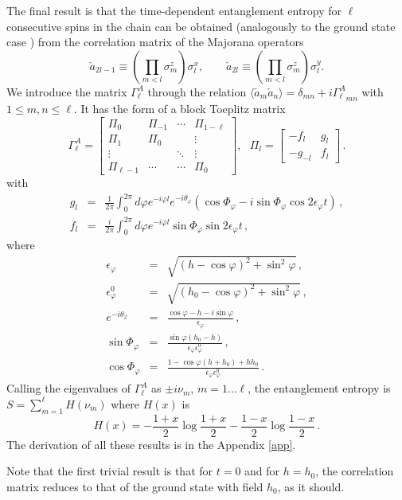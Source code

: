 \documentclass[12pt,preprint,tighten,eqsecnum,aps,floats,psfig,epsfig,amsmath,onecolumn]{revtex4-1}
\def\be{\begin{equation}}
\def\ee{\end{equation}}
\def\bea{\begin{eqnarray}}
\def\eea{\end{eqnarray}}
\def\e{\epsilon}
\def\p{\varphi}
\def\Ma{\check{a}}
\newcommand{\ev}[1]{\mbox{$\langle #1 \rangle$}}
\begin{document}
The final result is that the time-dependent entanglement entropy for 
$\ell$ 
consecutive spins in the chain can be obtained (analogously to the ground
state case \cite{Vidal}) from the correlation matrix of the Majorana 
operators
\be
\Ma_{2l-1} \equiv \left( \prod_{m<l} \sigma_m^z \right) \sigma_l^x, \qquad
\Ma_{2l} \equiv \left( \prod_{m<l} \sigma_m^z \right) \sigma_l^y.
\label{eq:aa}
\ee
We introduce the matrix $\Gamma^A_\ell$ through the relation
 $\ev{\Ma_m\Ma_n} = \delta_{mn} + i {\Gamma^A_\ell}_{mn}$ with $1\leq m,n\leq \ell$.
It has the form of a block Toeplitz matrix
\be
\Gamma^A_\ell = \left[
 \begin{array}{ccccc}
\Pi_0  & \Pi_{-1}   &   \cdots & \Pi_{1-\ell}  \\
\Pi_1 & \Pi_0   & &\vdots\\

\vdots&  & \ddots&\vdots  \\
\Pi_{\ell-1}& \cdots  & \cdots  & \Pi_0 
\end{array}
\right], ~~~ \Pi_l = \left[\begin{array}{cc}
-f_l    & g_l \\
-g_{-l} & f_l
\end{array}
\right]\,.
\label{eq:GammaAL}
\ee
with
\bea
g_l &=&  \frac{1}{2\pi} \int_0^{2\pi} d\p e^{-i\p l} e^{-i\theta_\p}
(\cos \Phi_\p-i\sin \Phi_\p \cos 2\e_\p t)
\,,\nonumber\\
f_l&=& \frac{i}{2\pi} \int_0^{2\pi} d\p e^{-i\p l} \sin \Phi_\p \sin 2 \e_\p t
\,,
\label{eq:g2}
\eea
where
\bea
\e_\p &=& \sqrt{(h-\cos{\p})^2 +  \sin^2{\p}}\,,\nonumber\\
\e_\p^0 &=& \sqrt{(h_0-\cos{\p})^2 +  \sin^2{\p}}\,,\nonumber\\
e^{-i\theta_\p}&=& \frac{\cos\p-h-i\sin\p}{\e_\p}\,,\nonumber\\
\sin \Phi_\p&=&\frac{\sin\p(h_0-h)}{\e_\p \e_\p^0}\,, \nonumber\\
\cos \Phi_\p&=&\frac{1-\cos\p(h+h_0)+h h_0}{\e_\p \e_\p^0}\,.
\eea
Calling the eigenvalues of $\Gamma^A_\ell$ as $\pm i \nu_m$, $m=1\dots \ell$,
the entanglement entropy is $S=\sum_{m=1}^\ell H(\nu_m)$ where $H(x)$ is
\be
H(x)= -\frac{1+x}{2} \log\frac{1+x}{2}  -\frac{1-x}{2} \log\frac{1-x}{2}\,.
\label{Hx}
\ee
The derivation of all these results is in the Appendix \ref{app}.

Note that the first trivial result is that for $t=0$ and for $h=h_0$,
the correlation matrix reduces to that of the ground state with field $h_0$,
as it should.
\end{document}
